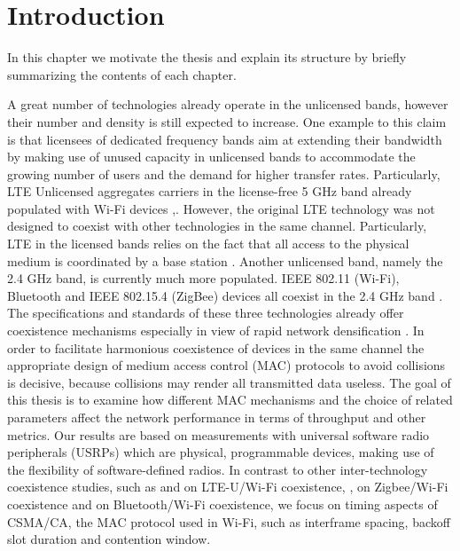 \chapter{Introduction}
\label{ch:introduction}

In this chapter we motivate the thesis and explain its structure by briefly summarizing the contents of each chapter.

A great number of technologies already operate in the unlicensed bands, however their number and density is still expected to increase. One example to this claim is that licensees of dedicated frequency bands aim at extending their bandwidth by making use of unused capacity in unlicensed bands to accommodate the growing number of users and the demand for higher transfer rates. Particularly, LTE Unlicensed aggregates carriers in the license-free 5 GHz band already populated with Wi-Fi devices \cite{nihtilä13},\cite{qualcomm15}. However, the original LTE technology was not designed to coexist with other technologies in the same channel. Particularly, LTE in the licensed bands relies on the fact that all access to the physical medium is coordinated by a base station \cite{ghosh10}. Another unlicensed band, namely the 2.4 GHz band, is currently much more populated. IEEE 802.11 (Wi-Fi), Bluetooth and IEEE 802.15.4 (ZigBee) devices all coexist in the 2.4 GHz band \cite{lee07}. The specifications and standards of these three technologies already offer coexistence mechanisms especially in view of rapid network densification \cite{bhushan14}. In order to facilitate harmonious coexistence of devices in the same channel the appropriate design of medium access control (MAC) protocols to avoid collisions is decisive, because collisions may render all transmitted data useless. The goal of this thesis is to examine how different MAC mechanisms and the choice of related parameters affect the network performance in terms of throughput and other metrics. Our results are based on measurements with universal software radio peripherals (USRPs) which are physical, programmable devices, making use of the flexibility of software-defined radios. In contrast to other inter-technology coexistence studies, such as \cite{gomezmiguelez16} and \cite{capretti16} on LTE-U/Wi-Fi coexistence, \cite{zhang11}, \cite{yi11} on Zigbee/Wi-Fi coexistence and \cite{chiasserini02} on Bluetooth/Wi-Fi coexistence, we focus on timing aspects of CSMA/CA, the MAC protocol used in Wi-Fi, such as interframe spacing, backoff slot duration and contention window.

